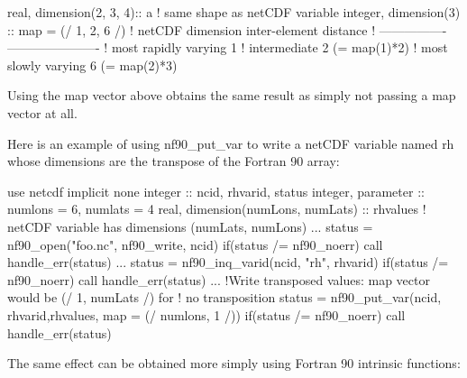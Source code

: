 \begin{DoxyCode}
\textcolor{keywordtype}{real},    \textcolor{keywordtype}{dimension(2, 3, 4)}:: a  \textcolor{comment}{! same shape as netCDF variable}
\textcolor{keywordtype}{integer}, \textcolor{keywordtype}{dimension(3)}      :: map  = (/ 1, 2, 6 /)
                    \textcolor{comment}{! netCDF dimension inter-element distance}
                    \textcolor{comment}{! ---------------- ----------------------}
                    \textcolor{comment}{! most rapidly varying       1}
                    \textcolor{comment}{! intermediate               2 (= map(1)*2)}
                    ! most slowly varying        6 (= map(2)*3)
\end{DoxyCode}


Using the map vector above obtains the same result as simply not passing a map vector at all.

Here is an example of using nf90\+\_\+put\+\_\+var to write a net\+C\+DF variable named rh whose dimensions are the transpose of the Fortran 90 array\+:


\begin{DoxyCode}
\textcolor{keywordtype}{use }netcdf
\textcolor{keywordtype}{implicit none}
\textcolor{keywordtype}{integer}                           :: ncid, rhvarid, status
\textcolor{keywordtype}{integer}, \textcolor{keywordtype}{parameter}                :: numlons = 6, numlats = 4
\textcolor{keywordtype}{real}, \textcolor{keywordtype}{dimension(numLons, numLats)} :: rhvalues
\textcolor{comment}{! netCDF variable has dimensions (numLats, numLons)}
...
status = nf90\_open(\textcolor{stringliteral}{"foo.nc"}, nf90\_write, ncid)
\textcolor{keywordflow}{if}(status /= nf90\_noerr) \textcolor{keyword}{call }handle\_err(status)
...
status = nf90\_inq\_varid(ncid, \textcolor{stringliteral}{"rh"}, rhvarid)
\textcolor{keywordflow}{if}(status /= nf90\_noerr) \textcolor{keyword}{call }handle\_err(status)
...
\textcolor{comment}{!Write transposed values: map vector would be (/ 1, numLats /) for}
\textcolor{comment}{!   no transposition}
status = nf90\_put\_var(ncid, rhvarid,rhvalues, map = (/ numlons, 1 /))
\textcolor{keywordflow}{if}(status /= nf90\_noerr) \textcolor{keyword}{call }handle\_err(status)
\end{DoxyCode}


The same effect can be obtained more simply using Fortran 90 intrinsic functions\+:


